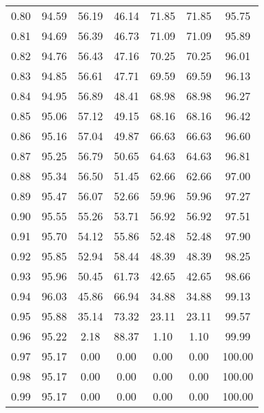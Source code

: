\begin{tabular}{|c|c|c|c|c|c|c|}
      0.80 &     94.59 &     56.19 &      46.14 &   71.85 &      71.85 &         95.75 \\
      0.81 &     94.69 &     56.39 &      46.73 &   71.09 &      71.09 &         95.89 \\
      0.82 &     94.76 &     56.43 &      47.16 &   70.25 &      70.25 &         96.01 \\
      0.83 &     94.85 &     56.61 &      47.71 &   69.59 &      69.59 &         96.13 \\
      0.84 &     94.95 &     56.89 &      48.41 &   68.98 &      68.98 &         96.27 \\
      0.85 &     95.06 &     57.12 &      49.15 &   68.16 &      68.16 &         96.42 \\
      0.86 &     95.16 &     57.04 &      49.87 &   66.63 &      66.63 &         96.60 \\
      0.87 &     95.25 &     56.79 &      50.65 &   64.63 &      64.63 &         96.81 \\
      0.88 &     95.34 &     56.50 &      51.45 &   62.66 &      62.66 &         97.00 \\
      0.89 &     95.47 &     56.07 &      52.66 &   59.96 &      59.96 &         97.27 \\
      0.90 &     95.55 &     55.26 &      53.71 &   56.92 &      56.92 &         97.51 \\
      0.91 &     95.70 &     54.12 &      55.86 &   52.48 &      52.48 &         97.90 \\
      0.92 &     95.85 &     52.94 &      58.44 &   48.39 &      48.39 &         98.25 \\
      0.93 &     95.96 &     50.45 &      61.73 &   42.65 &      42.65 &         98.66 \\
      0.94 &     96.03 &     45.86 &      66.94 &   34.88 &      34.88 &         99.13 \\
      0.95 &     95.88 &     35.14 &      73.32 &   23.11 &      23.11 &         99.57 \\
      0.96 &     95.22 &      2.18 &      88.37 &    1.10 &       1.10 &         99.99 \\
      0.97 &     95.17 &      0.00 &       0.00 &    0.00 &       0.00 &        100.00 \\
      0.98 &     95.17 &      0.00 &       0.00 &    0.00 &       0.00 &        100.00 \\
      0.99 &     95.17 &      0.00 &       0.00 &    0.00 &       0.00 &        100.00 \\
\bottomrule
\end{tabular}
